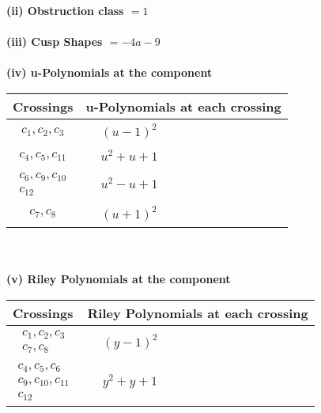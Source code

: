 \documentclass[1p]{elsarticle_modified}
\theoremstyle{definition}
\begin{document}
\flushleft \textbf{(ii) Obstruction class $= 1$}\\~\\
\flushleft \textbf{(iii) Cusp Shapes $= -4 a-9$}\\~\\
\newpage\renewcommand{\arraystretch}{1}
\flushleft \textbf{(iv) u-Polynomials at the component}\newline \\
\begin{tabular}{m{50pt}|m{274pt}}
Crossings & \hspace{64pt}u-Polynomials at each crossing \\
\hline $$\begin{aligned}c_{1},c_{2},c_{3}\end{aligned}$$&$\begin{aligned}
&(u-1)^2
\end{aligned}$\\
\hline $$\begin{aligned}c_{4},c_{5},c_{11}\end{aligned}$$&$\begin{aligned}
&u^2+u+1
\end{aligned}$\\
\hline $$\begin{aligned}c_{6},c_{9},c_{10}\\c_{12}\end{aligned}$$&$\begin{aligned}
&u^2- u+1
\end{aligned}$\\
\hline $$\begin{aligned}c_{7},c_{8}\end{aligned}$$&$\begin{aligned}
&(u+1)^2
\end{aligned}$\\
\hline
\end{tabular}\\~\\
\newpage\renewcommand{\arraystretch}{1}
\flushleft \textbf{(v) Riley Polynomials at the component}\newline \\
\begin{tabular}{m{50pt}|m{274pt}}
Crossings & \hspace{64pt}Riley Polynomials at each crossing \\
\hline $$\begin{aligned}c_{1},c_{2},c_{3}\\c_{7},c_{8}\end{aligned}$$&$\begin{aligned}
&(y-1)^2
\end{aligned}$\\
\hline $$\begin{aligned}c_{4},c_{5},c_{6}\\c_{9},c_{10},c_{11}\\c_{12}\end{aligned}$$&$\begin{aligned}
&y^2+y+1
\end{aligned}$\\
\hline
\end{tabular}\\~\\
\end{document}
